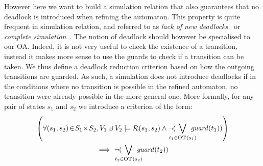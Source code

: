 \documentclass[runningheads]{llncs}
\begin{document}
%
%





However here we want to build a simulation relation that  also guarantees that no deadlock is introduced when refining the automaton. This property is quite frequent in simulation relation, and referred to as \emph{lack of new deadlocks}~\cite{Kouchnarenko:2007} or \emph{complete simulation}~\cite{sangiorgi:bisim-coind12}.
The notion of deadlock should however be specialised to our OA. 
Indeed, it is not very useful to check the  existence of a transition, instead it makes more sense to use the guards to check if a transition can be taken.
 We thus define a deadlock reduction criterion based on how the outgoing transitions are guarded.
As such, a simulation does not introduce deadlocks if in the conditions where no transition is possible in the refined automaton, no transition were already possible in the more general one. More formally, for any pair of states $s_1$ and $s_2$  we introduce a criterion of the form: 
\begin{multline*}
\left(\forall \mpar{s_1, s_2} \!\in\! S_1 \!\times\! S_2, V_1 \uplus V_2  \models \mathcal{R}\mpar{s_1, s_2} \wedge \lnot( \bigvee_\subbox{t_1 \in \fOT{s_1}} \fguard{t_1})\right) \\\implies \lnot( \bigvee_\subbox{t_2 \in \fOT{s_2}} \fguard{t_2}  )
\end{multline*}
\end{document}
